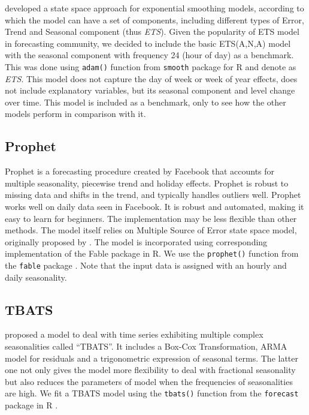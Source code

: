 \documentclass[]{elsarticle} %
\begin{document}
\citet{Hyndman2008b} developed a state space approach for exponential smoothing models, according to which the model can have a set of components, including different types of Error, Trend and Seasonal component (thus \emph{ETS}). Given the popularity of ETS model in forecasting community, we decided to include the basic ETS(A,N,A) model with the seasonal component with frequency 24 (hour of day) as a benchmark. This was done using \texttt{adam()} function from \texttt{smooth} package \citep{Svetunkov2021Smooth} for R and denote as \emph{ETS}. This model does not capture the day of week or week of year effects, does not include explanatory variables, but its seasonal component and level change over time. This model is included as a benchmark, only to see how the other models perform in comparison with it.

\hypertarget{prophet}{%
\subsection{Prophet}\label{prophet}}

Prophet is a forecasting procedure created by Facebook \citep{taylor2018forecasting} that accounts for multiple seasonality, piecewise trend and holiday effects. Prophet is robust to missing data and shifts in the trend, and typically handles outliers well. Prophet works well on daily data seen in Facebook. It is robust and automated, making it easy to learn for beginners. The implementation may be less flexible than other methods. The model itself relies on Multiple Source of Error state space model, originally proposed by \citet{Kalman1960}. The model is incorporated using corresponding implementation of the Fable package in R. We use the \texttt{prophet()} function from the \texttt{fable} package \citep{fable2020}. Note that the input data is assigned with an hourly and daily seasonality.

\hypertarget{tbats}{%
\subsection{TBATS}\label{tbats}}

\citet{de2011forecasting} proposed a model to deal with time series exhibiting multiple complex seasonalities called ``TBATS''. It includes a Box-Cox Transformation, ARMA model for residuals and a trigonometric expression of seasonal terms. The latter one not only gives the model more flexibility to deal with fractional seasonality but also reduces the parameters of model when the frequencies of seasonalities are high. We fit a TBATS model using the \texttt{tbats()} function from the \texttt{forecast} package in R \citep{forecastpackage2020}.
\end{document}
